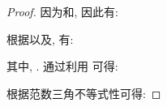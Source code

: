 \begin{proof}
        因为和, 因此有:
        \begin{comment}\label{sys:err}
        \nonumber \mathrm{E}\mathcal{L}V(t)&=\mathrm{E}\Big\{\hat{e}^{\top}(t)\dot{\hat{e}}(t)+\frac{1}{2}\sum_{v=1}^{m}q_{uv}\hat{e}^{\top}(t)\hat{e}(t)\Big\}\\
        \nonumber&=\mathrm{E}\Big\{\hat{e}^{\top}(t)[L_{u}\otimes I_n]f(t,x(t),x(t-\tau))
        -c\hat{e}^{\top}(t)[(L^2_u+\rho\beta L_u)\otimes \Gamma]e(t)\\
        &\quad-c\hat{e}^{\top}(t)[(L^2_u+\rho\beta L_u)\otimes \Gamma]{\delta}(t)
        +\frac{1}{2}\sum_{v=1}^{m}q_{uv}e^\top(t)[L^2_{v}\otimes I_n]e(t)\Big\}.
        \end{comment}
        根据以及, 有:
        \begin{comment}\label{e1}
        \nonumber&\quad\mathrm{E}\Big\{\hat{e}^{\top}(t)[L_{u}\otimes I_n]f(t,x(t),x(t-\tau))\Big\}\\
        \nonumber &=\mathrm{E}\Big\{\hat{x}(t)[L_{u}\otimes I_n]\big[f(t,x(t),x(t-\tau))-\mathbf{1}_N\otimes f(t,{s}(t),{s}(t-\tau))\big]\Big\}\\
        \nonumber &\leq\mathrm{E}\Big\{\|\hat{x}(t)\|\|L_{u}\otimes I_n\|(\alpha_1\|e(t)\|+\alpha_2\|e(t-\tau)\|)\Big\}\\
        \nonumber &\leq\mathrm{E}\Big\{\bar{\lambda}\alpha_1\|\hat{x}(t)\|\|e(t)\|+\bar{\lambda}\alpha_2\|\hat{x}(t)\|\|e(t-\tau)\|)\Big\}\\
        \nonumber &\leq\frac{\bar{\lambda}\alpha_1}{\lambda_2}\mathrm{E}\|\hat{x}(t)\|^2+\bar{\lambda}\alpha_2(\mathrm{E}\|\hat{x}(t)\|^2+\frac{1}{2}\mathrm{E}\|e(t-\tau)\|^2)\\
        \nonumber &\leq\pi\mathrm{E}\|\hat{x}(t)\|^2+b\mathrm{E}V(t-\tau)\\
        &=-2a\mathrm{E}V(t)+b\mathrm{E}V(t-\tau)+(\pi+a)\mathrm{E}\{\hat{x}^\top(t)\hat{x}(t)\},
        \end{comment}
        其中, .
        通过利用 可得:
        \begin{comment}\label{e13}
        \nonumber-c\mathrm{E}\Big\{\hat{e}^{\top}(t)[(L^2_u+\rho\beta L_u)\otimes \Gamma]e(t)\Big\}&=-c\mathrm{E}\Big\{\hat{e}^{\top}(t)[(L_u+\rho\beta I_N)\otimes \Gamma]\hat{e}(t)\Big\}\\
        &\leq-c\gamma(\lambda_2+\rho\beta)\mathrm{E}\{\hat{x}^{\top}(t)\hat{x}(t)\}.
        \end{comment}
        根据范数三角不等式性可得:
        \begin{comment}\label{e15}
        -c\mathrm{E}\Big\{\hat{e}^{\top}(t)[(L^2_u+\rho\beta L_u)\otimes \Gamma]{\delta}(t)\Big\}

\end{comment}
\end{proof}
